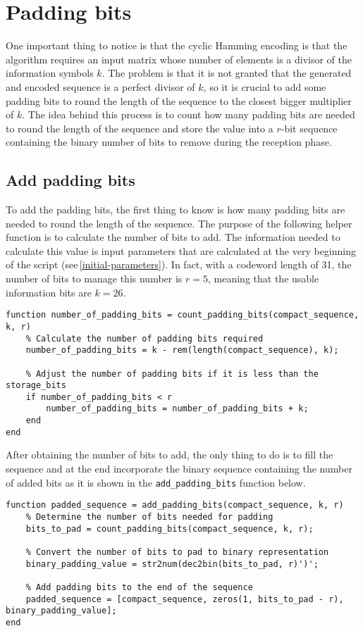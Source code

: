 \vspace{40px} \section{Padding bits}
One important thing to notice is that the cyclic Hamming encoding is that the algorithm requires an input matrix whose number of elements is a divisor of the information symbols $k$. The problem is that it is not granted that the generated and encoded sequence is a perfect divisor of $k$, so it is crucial to add some padding bits to round the length of the sequence to the closest bigger multiplier of $k$. The idea behind this process is to count how many padding bits are needed to round the length of the sequence and store the value into a $r$-bit sequence containing the binary number of bits to remove during the reception phase.


\subsection{Add padding bits}
To add the padding bits, the first thing to know is how many padding bits are needed to round the length of the sequence. The purpose of the following helper function is to calculate the number of bits to add. The information needed to calculate this value is input parameters that are calculated at the very beginning of the script (see\,\ref{initial-parameters}). In fact, with a codeword length of 31, the number of bits to manage this number is $r = 5$, meaning that the usable information bits are $k = 26$.

\begin{lstlisting}
function number_of_padding_bits = count_padding_bits(compact_sequence, k, r)  
    % Calculate the number of padding bits required
    number_of_padding_bits = k - rem(length(compact_sequence), k);

    % Adjust the number of padding bits if it is less than the storage_bits
    if number_of_padding_bits < r
        number_of_padding_bits = number_of_padding_bits + k;
    end
end
\end{lstlisting}

\noindent After obtaining the number of bits to add, the only thing to do is to fill the sequence and at the end incorporate the binary sequence containing the number of added bits as it is shown in the \texttt{add\_padding\_bits} function below.

\begin{lstlisting}
function padded_sequence = add_padding_bits(compact_sequence, k, r)
    % Determine the number of bits needed for padding
    bits_to_pad = count_padding_bits(compact_sequence, k, r);

    % Convert the number of bits to pad to binary representation
    binary_padding_value = str2num(dec2bin(bits_to_pad, r)')';

    % Add padding bits to the end of the sequence
    padded_sequence = [compact_sequence, zeros(1, bits_to_pad - r), binary_padding_value];
end
\end{lstlisting}


